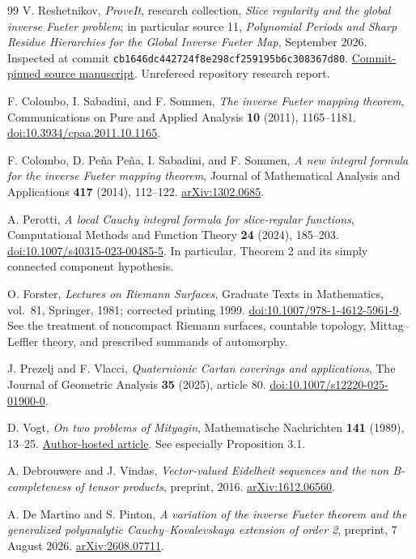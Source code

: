 \documentclass[11pt,a4paper]{article}
\numberwithin{equation}{section}
\theoremstyle{definition}
\theoremstyle{remark}
\begin{document}
\begin{thebibliography}{99}
V. Reshetnikov, \emph{ProveIt}, research collection,
\emph{Slice regularity and the global inverse Fueter problem}; in particular
source 11, \emph{Polynomial Periods and Sharp Residue Hierarchies for the Global
Inverse Fueter Map}, September 2026.
Inspected at commit \texttt{cb1646dc442724f8e298cf259195b6c308367d80}.
\href{https://github.com/VladimirReshetnikov/ProveIt/blob/cb1646dc442724f8e298cf259195b6c308367d80/SetTheory/Cardinals/docs/reports/quaternionic-analysis/slice-regularity-and-fueter-inversion/sources/11-polynomial-periods.tex}{Commit-pinned source manuscript}.
Unrefereed repository research report.

F. Colombo, I. Sabadini, and F. Sommen,
\emph{The inverse Fueter mapping theorem},
Communications on Pure and Applied Analysis \textbf{10} (2011), 1165--1181.
\href{https://doi.org/10.3934/cpaa.2011.10.1165}{doi:10.3934/cpaa.2011.10.1165}.

F. Colombo, D. Pe\~na Pe\~na, I. Sabadini, and F. Sommen,
\emph{A new integral formula for the inverse Fueter mapping theorem},
Journal of Mathematical Analysis and Applications \textbf{417} (2014), 112--122.
\href{https://arxiv.org/abs/1302.0685}{arXiv:1302.0685}.

A. Perotti, \emph{A local Cauchy integral formula for slice-regular functions},
Computational Methods and Function Theory \textbf{24} (2024), 185--203.
\href{https://doi.org/10.1007/s40315-023-00485-5}{doi:10.1007/s40315-023-00485-5}.
In particular, Theorem 2 and its simply connected component hypothesis.

O. Forster, \emph{Lectures on Riemann Surfaces}, Graduate Texts in Mathematics,
vol.~81, Springer, 1981; corrected printing 1999.
\href{https://doi.org/10.1007/978-1-4612-5961-9}{doi:10.1007/978-1-4612-5961-9}.
See the treatment of noncompact Riemann surfaces, countable topology,
Mittag--Leffler theory, and prescribed summands of automorphy.

J. Prezelj and F. Vlacci, \emph{Quaternionic Cartan coverings and applications},
The Journal of Geometric Analysis \textbf{35} (2025), article 80.
\href{https://doi.org/10.1007/s12220-025-01900-0}{doi:10.1007/s12220-025-01900-0}.

D. Vogt, \emph{On two problems of Mityagin},
Mathematische Nachrichten \textbf{141} (1989), 13--25.
\href{https://www2.math.uni-wuppertal.de/~vogt/preprints/Eigene/44.pdf}{Author-hosted article}.
See especially Proposition 3.1.

A. Debrouwere and J. Vindas,
\emph{Vector-valued Eidelheit sequences and the non B-completeness of tensor
products}, preprint, 2016.
\href{https://arxiv.org/abs/1612.06560}{arXiv:1612.06560}.

A. De Martino and S. Pinton,
\emph{A variation of the inverse Fueter theorem and the generalized polyanalytic
Cauchy--Kovalevskaya extension of order 2}, preprint, 7 August 2026.
\href{https://arxiv.org/abs/2608.07711}{arXiv:2608.07711}.

\end{thebibliography}
\end{document}
